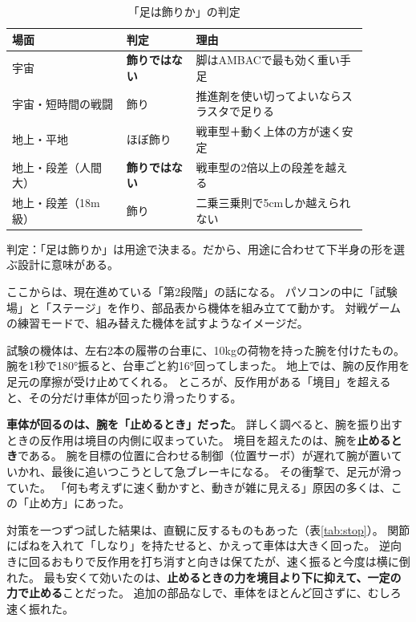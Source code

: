 \documentclass[paper=a4paper,fontsize=10pt,twocolumn,column_gap=2zw,line_length=24zw,number_of_lines=46,head_space=18mm]{jlreq}
\makeatletter
\newcounter{msec}
\renewcommand{\section}{\@ifstar{\msecstar}{\msecbox}}
\newcommand{\msecstar}[1]{\par\addvspace{0.6\baselineskip}\noindent{\bfseries\color{accent2}#1}\par\nopagebreak\vspace{0.2\baselineskip}}
\newcommand{\msecbox}[1]{\par\addvspace{0.8\baselineskip}\refstepcounter{msec}%
  \noindent\colorbox{accent2}{\parbox{\dimexpr\linewidth-2\fboxsep}{\color{white}\bfseries\large\strut\themsec\quad #1}}%
  \par\nopagebreak\vspace{0.4\baselineskip}\nopagebreak}
\makeatother
\begin{document}
\begin{table}[t]\centering\small
\caption{「足は飾りか」の判定}\label{tab:legs}
\begin{tabular}{p{0.29\linewidth}p{0.17\linewidth}p{0.42\linewidth}}\toprule
場面 & 判定 & 理由 \\\midrule
宇宙 & \textbf{飾りではない} & 脚はAMBACで最も効く重い手足 \\
宇宙・短時間の戦闘 & 飾り & 推進剤を使い切ってよいならスラスタで足りる \\
地上・平地 & ほぼ飾り & 戦車型＋動く上体の方が速く安定 \\
地上・段差（人間大） & \textbf{飾りではない} & 戦車型の2倍以上の段差を越える \\
地上・段差（18m級） & 飾り & 二乗三乗則で5cmしか越えられない \\\bottomrule
\end{tabular}
\end{table}

\begin{verdict}
判定：「足は飾りか」は用途で決まる。だから、用途に合わせて下半身の形を選ぶ設計に意味がある。
\end{verdict}

\section{速くすると、次は「止め方」}

ここからは、現在進めている「第2段階」の話になる。
パソコンの中に「試験場」と「ステージ」を作り、部品表から機体を組み立てて動かす。
対戦ゲームの練習モードで、組み替えた機体を試すようなイメージだ。

試験の機体は、左右2本の履帯の台車に、10kgの荷物を持った腕を付けたもの。
腕を1秒で180°振ると、台車ごと約16°回ってしまった。
地上では、腕の反作用を足元の摩擦が受け止めてくれる。
ところが、反作用がある「境目」を超えると、その分だけ車体が回ったり滑ったりする。

\textbf{車体が回るのは、腕を「止めるとき」だった}。
詳しく調べると、腕を振り出すときの反作用は境目の内側に収まっていた。
境目を超えたのは、腕を\textbf{止めるとき}である。
腕を目標の位置に合わせる制御（位置サーボ）が遅れて腕が置いていかれ、最後に追いつこうとして急ブレーキになる。
その衝撃で、足元が滑っていた。
「何も考えずに速く動かすと、動きが雑に見える」原因の多くは、この「止め方」にあった。

対策を一つずつ試した結果は、直観に反するものもあった（表\ref{tab:stop}）。
関節にばねを入れて「しなり」を持たせると、かえって車体は大きく回った。
逆向きに回るおもりで反作用を打ち消すと向きは保てたが、速く振ると今度は横に倒れた。
最も安くて効いたのは、\textbf{止めるときの力を境目より下に抑えて、一定の力で止める}ことだった。
追加の部品なしで、車体をほとんど回さずに、むしろ速く振れた。
\end{document}
